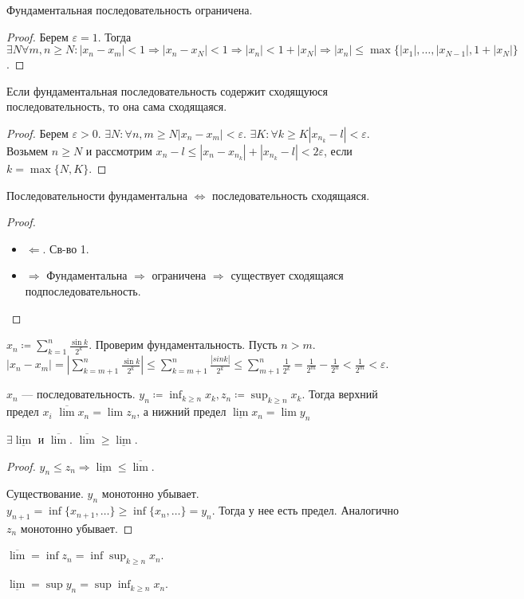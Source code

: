 \begin{property}
    Фундаментальная последовательность ограничена.
\end{property}
\begin{proof}
    Берем $\varepsilon=1$. Тогда  $\exists N \forall m, n \ge N: |x_n - x_m| < 1 \Rightarrow |x_n - x_N| < 1 \Rightarrow |x_n| < 1 + |x_N| \Rightarrow |x_n| \le \max\{|x_1|, \ldots, |x_{N-1}|, 1 + |x_N|\}$.
\end{proof}
\begin{property}
   Если фундаментальная последовательность содержит сходящуюся последовательность, то она сама сходящаяся.
\end{property}
\begin{proof}
    Берем $\varepsilon >0$.  $\exists N: \forall n, m \ge N |x_n - x_m| < \varepsilon$. $\exists K: \forall k \ge K |x_{n_k} - l| < \varepsilon$. Возьмем $n \ge N$ и рассмотрим $x_n - l \le |x_n - x_{n_k}| + |x_{n_k} -l| < 2 \varepsilon$, если $k = \max\{N, K\}$.
\end{proof}
\begin{theorem}
    Последовательности фундаментальна $\iff$ последовательность сходящаяся. 
\end{theorem}
\begin{proof}
    \slashn
    \begin{itemize}
        \item $\Leftarrow$. Св-во 1.
        \item  $\Rightarrow$ Фундаментальна  $\Rightarrow$ ограничена  $\Rightarrow$ существует сходящаяся подпоследовательность.
    \end{itemize}
\end{proof}
\begin{example}
    $x_n \coloneqq \displaystyle \sum_{k=1}^n \frac{\sin k}{2^k}$. Проверим фундаментальность. Пусть $n > m$.  $|x_n - x_m| = |\sum_{k=m+1}^n \frac{\sin k}{2^k}| \le \sum_{k=m+1}^n \frac{|sin k|}{2^k} \le \sum_{m+1}^n \frac{1}{2^k} = \frac{1}{2^m} - \frac{1}{2^n} < \frac{1}{2^m} < \varepsilon$.
\end{example}
\begin{definition}
    $x_n$ --- последовательность.  $y_n \coloneqq \inf_{k \ge n} x_k, z_n \coloneqq \sup_{k \ge n} x_k$. Тогда верхний предел $x_i$  $\overline{\lim} x_n = \lim z_n$, а нижний предел  $\underline{\lim} x_n = \lim y_n$
\end{definition}
\begin{theorem}
    $\exists \underline{\lim}$ и $\overline{\lim}$.  $\overline{\lim} \ge \underline{\lim}$.
\end{theorem}
\begin{proof}
    $y_n \le z_n \Rightarrow \underline{\lim} \le \overline{\lim}$.

    Существование. $y_n$ монотонно убывает.  $y_{n+1} = \inf \{x_{n+1},\ldots\} \ge \inf\{x_n,\ldots\} = y_n$. Тогда у нее есть предел. Аналогично $z_n$ монотонно убывает.
\end{proof}
\begin{remark}
    $\overline{\lim} = \inf z_n = \inf \sup_{k \ge n} x_n$.

    $\underline{\lim} = \sup y_n = \sup \inf_{k \ge n} x_n$.
\end{remark}

